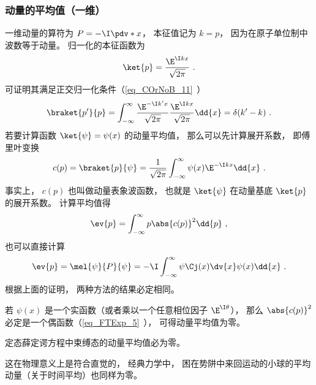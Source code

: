 \subsubsection{动量的平均值（一维）}
一维动量的算符为 $P = -\I\pdv*{x}$， 本征值记为 $k = p$， 因为在原子单位制中波数等于动量。 归一化的本征函数为
\begin{equation}
\ket{p} = \frac{\E^{\I k x}}{\sqrt{2\pi}}~.
\end{equation}
可证明其满足正交归一化条件（\autoref{eq_COrNoB_11}~）
\begin{equation}
\braket{p'}{p} = \int_{-\infty}^{\infty} \frac{\E^{-\I k' x}}{\sqrt{2\pi}} \frac{\E^{\I k x}}{\sqrt{2\pi}} \dd{x} = \delta(k' - k)~.
\end{equation}
若要计算函数 $\ket{\psi} = \psi(x)$ 的动量平均值， 那么可以先计算展开系数， 即傅里叶变换
\begin{equation}
c(p) = \braket{p}{\psi} = \frac{1}{\sqrt{2\pi}}\int_{-\infty}^{\infty} \psi(x)\E^{-\I kx} \dd{x}~.
\end{equation}
事实上， $c(p)$ 也叫做动量表象波函数， 也就是 $\ket{\psi}$ 在动量基底 $\ket{p}$ 的展开系数。 计算平均值得
\begin{equation}
\ev{p} = \int_{-\infty}^{\infty} p \abs{c(p)}^2\dd{p}~,
\end{equation}
也可以直接计算
\begin{equation}
\ev{p} = \mel{\psi}{P}{\psi} = -\I\int_{-\infty}^{\infty} \psi\Cj(x) \dv{x} \psi(x) \dd{x}~.
\end{equation}
根据上面的证明， 两种方法的结果必定相同。

\begin{theorem}{}\label{the_QMavg_1}
若 $\psi(x)$ 是一个实函数（或者乘以一个任意相位因子 $\E^{\I \theta}$）， 那么 $\abs{c(p)}^2$ 必定是一个偶函数（\autoref{eq_FTExp_5}~）， 可得动量平均值为零。
\end{theorem}

\begin{corollary}{}
定态薛定谔方程中束缚态的动量平均值必为零。
\end{corollary}
这在物理意义上是符合直觉的， 经典力学中， 困在势阱中来回运动的小球的平均动量（关于时间平均）也同样为零。

